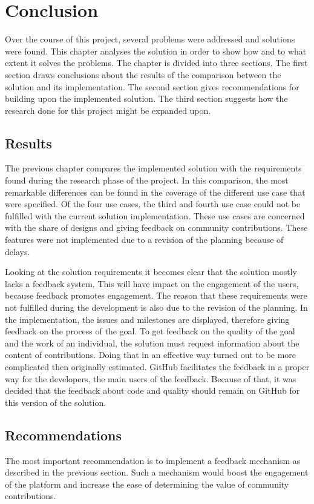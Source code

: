 \chapter{Conclusion}

Over the course of this project, several problems were addressed and solutions were found. This chapter analyses the solution in order to show how and to what extent it solves the problems. The chapter is divided into three sections. The first section draws conclusions about the results of the comparison between the solution and its implementation. The second section gives recommendations for building upon the implemented solution. The third section suggests how the research done for this project might be expanded upon.

\section{Results}

The previous chapter compares the implemented solution with the requirements found during the research phase of the project. In this comparison, the most remarkable differences can be found in the coverage of the different use case that were specified. Of the four use cases, the third and fourth use case could not be fulfilled with the current solution implementation. These use cases are concerned with the share of designs and giving feedback on community contributions. These features were not implemented due to a revision of the planning because of delays.

Looking at the solution requirements it becomes clear that the solution mostly lacks a feedback system. This will have impact on the engagement of the users, because feedback promotes engagement. The reason that these requirements were not fulfilled during the development is also due to the revision of the planning. In the implementation, the issues and milestones are displayed, therefore giving feedback on the process of the goal. To get feedback on the quality of the goal and the work of an individual, the solution must request information about the content of contributions. Doing that in an effective way turned out to be more complicated then originally estimated. GitHub facilitates the feedback in a proper way for the developers, the main users of the feedback. Because of that, it was decided that the feedback about code and quality should remain on GitHub for this version of the solution.

\section{Recommendations}
The most important recommendation is to implement a feedback mechanism as described in the previous section. Such a mechanism would boost the engagement of the platform and increase the ease of determining the value of community contributions.

